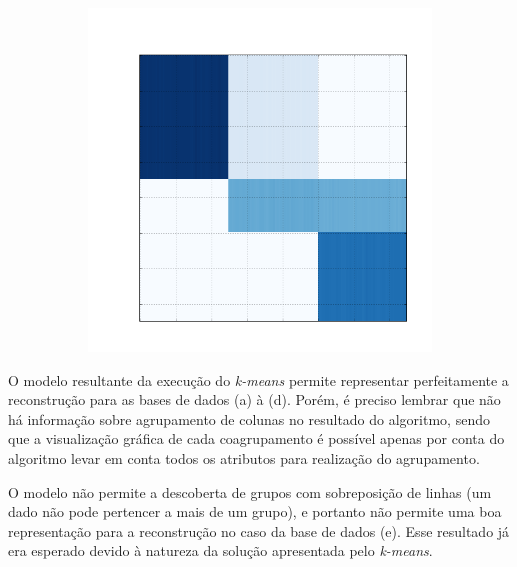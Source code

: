 \documentclass[
    12pt,                %
    oneside,            %
    a4paper,            %
    english,            %
    brazil                %
    ]{abntex2ppgsi}
\begin{document}
\begin{figure}[H]
\begin{subfigure}[b]{0.18\textwidth}
        \caption{}
    \end{subfigure}
    \begin{subfigure}[b]{0.18\textwidth}
        \includegraphics[width=\textwidth]{img/e-reconstruction-kmeans.png}
        \caption{}
    \end{subfigure}
    \label{fig:reconstruction:kmeans}
\end{figure}


O modelo resultante da execução do \textit{k-means} permite representar perfeitamente a reconstrução para as bases de dados (a) à (d).
Porém, é preciso lembrar que não há informação sobre agrupamento de colunas no resultado do algoritmo, sendo que a visualização gráfica de cada coagrupamento é possível apenas por conta do algoritmo levar em conta todos os atributos para realização do agrupamento.

O modelo não permite a descoberta de grupos com sobreposição de linhas (um dado não pode pertencer a mais de um grupo), e portanto não permite uma boa representação para a reconstrução no caso da base de dados (e).
Esse resultado já era esperado devido à natureza da solução apresentada pelo \textit{k-means}.
\end{document}
